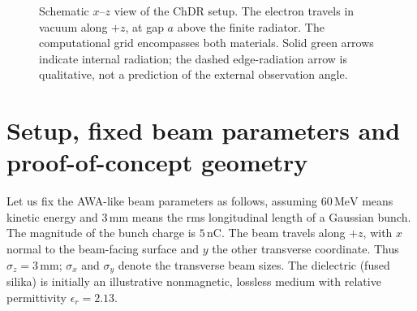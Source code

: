 \documentclass[11pt,a4paper]{article}
\newcommand{\unit}[1]{\,\mathrm{#1}}
\numberwithin{equation}{section}
\begin{document}
\begin{figure}[!ht]
\caption{Schematic \(x\)--\(z\) view of the ChDR setup.
The electron travels in vacuum along \(+z\), at gap \(a\) above the finite
radiator. The computational grid encompasses both materials. Solid green arrows indicate
internal radiation; the dashed edge-radiation arrow is qualitative, not a
prediction of the external observation angle.}
\label{fig:geometry}
\end{figure}





\section{Setup, fixed beam parameters and proof-of-concept geometry}
\label{sec:setup}

Let us fix the AWA-like beam parameters as follows, assuming \(60\unit{MeV}\) means
kinetic energy and \(3\unit{mm}\) means the rms longitudinal length of a
Gaussian bunch. The magnitude of the bunch charge is \(5\unit{nC}\).
The beam travels along \(+z\), with \(x\) normal to the beam-facing surface
and \(y\) the other transverse coordinate. Thus \(\sigma_z=3\unit{mm}\);
\(\sigma_x\) and \(\sigma_y\) denote the transverse beam sizes.
The dielectric (fused silika) is initially an illustrative nonmagnetic, lossless medium
with relative permittivity \(\epsilon_r=2.13\). 
\end{document}
